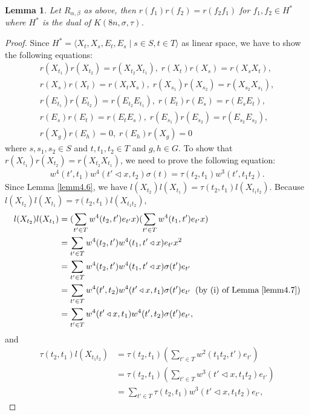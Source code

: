 \documentclass[a4paper,11pt]{amsart}
\numberwithin{equation}{section}
\newtheorem{lemma}[theorem]{Lemma}
\begin{document}
\begin{lemma}\label{lemm4.8}
Let $R_{\alpha,\beta}$ as above, then $r(f_1)r(f_2)=r(f_2 f_1)$ for $f_1,f_2\in H^*$ where $H^*$ is the dual of $K(8n,\sigma,\tau)$.
\end{lemma}
\begin{proof}
Since $H^*=\langle X_t,X_s,E_t,E_s\;|\;s\in S,t\in T\rangle$ as linear space, we have to show the following equations:
\begin{gather}
\label{re1} r(X_{t_1})r(X_{t_2})=r(X_{t_2} X_{t_1}),\;r(X_t)r(X_s)=r(X_{s}X_{t}),\\
\label{re2} r(X_s)r(X_t)=r(X_{t}X_{s}),\;r(X_{s_1})r(X_{s_2})=r(X_{s_2}X_{s_1}),\\
\label{re3} r(E_{t_1})r(E_{t_2})=r(E_{t_2} E_{t_1}),\;r(E_t)r(E_s)=r(E_{s}E_{t}),\\
\label{re4} r(E_s)r(E_t)=r(E_{t}E_s),\;r(E_{s_1})r(E_{s_2})=r(E_{s_2} E_{s_2}),\\
\label{re5} r(X_g)r(E_h)=0,\;r(E_h)r(X_g)=0
\end{gather}
where $s,s_1,s_2\in S$ and $t,t_1,t_2\in T$ and $g,h\in G$. To show that $r(X_{t_1})r(X_{t_2})=r(X_{t_2} X_{t_1})$, we need to prove the following equation:
\begin{align}
\label{rw.1} w^4(t',t_1) w^4(t'\triangleleft x,t_2) \sigma(t)=\tau(t_2,t_1) w^3(t',t_1 t_2).
\end{align}
Since Lemma \ref{lemm4.6}, we have $l(X_{t_2}) l(X_{t_1})=\tau(t_2,t_1)l(X_{t_1 t_2})$. Because $l(X_{t_2}) l(X_{t_1})=\tau(t_2,t_1)l(X_{t_1 t_2})$,
\begin{align*}
l(X_{t_2})l(X_{t_1})&=(\sum_{t'\in T} w^4(t_2,t')e_{t'}x) (\sum_{t'\in T} w^4(t_1,t')e_{t'}x)\\
&=\sum_{t'\in T} w^4(t_2,t') w^4(t_1,t' \triangleleft x) e_{t'}x^2\\
&=\sum_{t'\in T} w^4(t_2,t') w^4(t_1,t' \triangleleft x) \sigma(t') e_{t'}\\
&=\sum_{t'\in T} w^4(t',t_2) w^4(t' \triangleleft x,t_1) \sigma(t') e_{t'}\;\;(\text{by (i) of Lemma}\;\ref{lemm4.7})\\
&=\sum_{t'\in T} w^4(t' \triangleleft x,t_1) w^4(t',t_2) \sigma(t') e_{t'},
\end{align*}
and
\begin{align*}
\tau(t_2,t_1)l(X_{t_1 t_2})&=\tau(t_2,t_1) (\sum_{t'\in T} w^2(t_1 t_2,t')e_{t'})\\
&=\tau(t_2,t_1) (\sum_{t'\in T} w^3(t'\triangleleft x,t_1 t_2)e_{t'})\\
&= \sum_{t'\in T}\tau(t_2,t_1) w^3(t'\triangleleft x,t_1 t_2)e_{t'},

\end{align*}
\end{proof}
\end{document}
